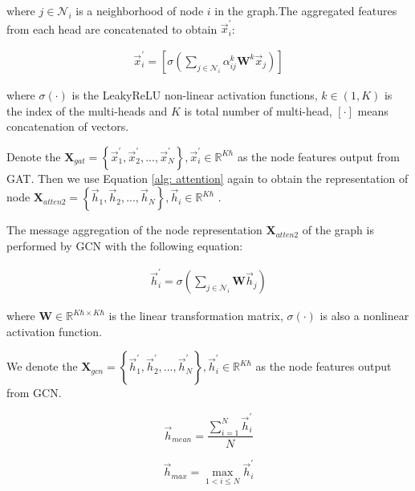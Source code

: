 \documentclass{article}
\begin{document}
\noindent where $ j \in \mathcal{N}_{i} $ is a neighborhood of node $i$ in the graph.The aggregated features from each head are concatenated to obtain $\vec{x}_{i}^{\prime}$:


\begin{align}
    \vec{x}_{i}^{\prime}=   \left[ \sigma\left(\sum_{j \in \mathcal{N}_{i}} \alpha_{i j}^{k}                                 \mathbf{W}^{k} \vec{x}_{j}\right) \right ]
\end{align}

\noindent where $\sigma(\cdot )$ is the LeakyReLU non-linear activation functions, $k \in (1,K)$ is the index of the multi-heads and $K$ is total number of multi-head,   $\left [ \cdot  \right ]$ means concatenation of vectors.

Denote the $\mathbf{X}_{gat} = \left \{   \vec{x}_1^{\prime}, \vec{x}_2^{\prime}, ... ,\vec{x}_N^{\prime} \right \} , \vec{x}_i^{\prime} \in \mathbb{R}^{ K\hbar}$ as the node features output from GAT. Then we use Equation \ref{alg: attention} again to obtain the representation of node $\mathbf{X}_{atten2} = \left \{   \vec{h}_1, \vec{h}_2, ... ,\vec{h}_N \right \} , \vec{h}_i \in \mathbb{R}^{ K\hbar}$ .




The message aggregation of the node representation $\mathbf{X}_{atten2}$ of the graph is performed by GCN with the following equation:

\begin{align}
    \vec{h}_{i}^{\prime}=  \sigma\left(\sum_{j \in \mathcal{N}_{i}} \mathbf{W} \vec{h}_{j}\right) 
\end{align}

\noindent where $\mathbf{W} \in \mathbb{R}^{K\hbar \times  K\hbar}$ is the linear transformation matrix, $\sigma(\cdot )$ is also a nonlinear activation function.

We denote the $\mathbf{X}_{gcn} = \left \{   \vec{h}_1^{\prime}, \vec{h}_2^{\prime}, ... ,\vec{h}_N^{\prime} \right \} , \vec{h}_i^{\prime} \in \mathbb{R}^{K\hbar}$ as the node features output from GCN.

\begin{equation}
       \vec{h}_{mean} = \frac{\sum_{i=1}^{N} { \vec{h}_i^{\prime} }}{N} 
\end{equation}

\begin{equation}
     \vec{h}_{max} = \max \limits_{1<i\le N }\vec{h}_i^{\prime} 
\end{equation}
\end{document}
